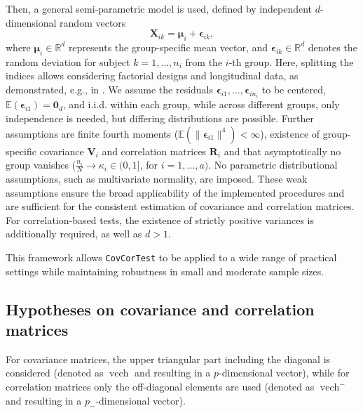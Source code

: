 Then, a general semi-parametric model is used, defined by independent
\(d\)-dimensional random vectors
\begin{equation}
\boldsymbol{X}_{ik}
= \boldsymbol{\mu}_i + \boldsymbol{\epsilon}_{ik},
\label{eq:model}
\end{equation}
where \(\boldsymbol{\mu}_i \in \mathbb{R}^d\) represents the group-specific mean
vector, and \(\boldsymbol{\epsilon}_{ik} \in \mathbb{R}^d\) denotes the random
deviation for subject \(k = 1, \dots, n_i\) from the \(i\)-th group. Here, splitting
the indices allows considering factorial designs and longitudinal data, as
demonstrated, e.g., in \citet{pauly2015}. We assume the residuals
\(\boldsymbol{\epsilon}_{i1}, \dots, \boldsymbol{\epsilon}_{in_i}\)
to be centered,
\(\mathbb{E}(\boldsymbol{\epsilon}_{i1}) = \mathbf{0}_d\), and i.i.d. within each group, while
across different groups, only independence is needed, but differing
distributions are possible. Further assumptions are finite fourth moments
(\(\mathbb{E}(\lVert \boldsymbol{\epsilon}_{i1} \rVert^4) < \infty\)), existence of
group-specific covariance \(\boldsymbol{V}_i\) and correlation matrices \(\boldsymbol{R}_i\) and that
asymptotically no group vanishes
(\(\frac{n_i}{N} \longrightarrow\kappa_i \in (0,1]\), for \(i = 1, \dots, a) .\) No parametric
distributional assumptions, such as multivariate normality, are
imposed. These weak assumptions ensure the broad applicability of the
implemented procedures and are sufficient for the consistent estimation of
covariance and correlation matrices. For correlation-based tests, the existence
of strictly positive variances is additionally required, as well as \(d > 1\).

This framework allows \texttt{CovCorTest} to be applied to a wide range of
practical settings while maintaining robustness in small and moderate sample
sizes.

\subsection{Hypotheses on covariance and correlation matrices}\label{hypotheses-on-covariance-and-correlation-matrices}

For covariance matrices, the upper triangular part including the diagonal is
considered (denoted as \(\operatorname{vech}\) and resulting in a \(p\)-dimensional vector), while
for correlation matrices only the off-diagonal elements are used (denoted as
\(\operatorname{vech}^{-}\) and resulting in a \(p_{-}\)-dimensional vector).

